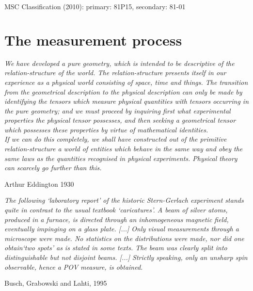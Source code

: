 \documentclass[12pt]{article}
\begin{document}
\bigskip\noindent
MSC Classification (2010): primary: 81P15, secondary: 81-01

\newpage
\tableofcontents %

\newpage
\section{The measurement process}\label{s.measP}

\nopagebreak
\hfill\parbox[t]{10.8cm}{\footnotesize

{\em We have developed a pure geometry, which is intended to be
descriptive of the relation-structure of the world. The
relation-structure presents itself in our experience as a physical world
consisting of space, time and things. The transition from the
geometrical description to the physical description can only be made by
identifying the tensors which measure physical quantities with tensors
occurring in the pure geometry; and we must proceed by inquiring first
what experimental properties the physical tensor possesses, and then
seeking a geometrical tensor which possesses these properties by virtue
of mathematical identities. \\
If we can do this completely, we shall have constructed out of the
primitive relation-structure a world of entities which behave in the
same way and obey the same laws as the quantities recognised in physical
experiments. Physical theory can scarcely go further than this.}

\hfill Arthur Eddington 1930 \cite[p.222]{Edd}
}

\bigskip


\nopagebreak
\hfill\parbox[t]{10.8cm}{\footnotesize

{\em The following `laboratory report' of the historic Stern-Gerlach
experiment stands quite in contrast to the usual textbook `caricatures'.
A beam of silver atoms, produced in a furnace, is directed through an
inhomogeneous magnetic field, eventually impinging on a glass plate.
[...]
Only visual measurements through a microscope were made. No statistics
on the distributions were made, nor did one obtain`two spots' as is
stated in some texts. The beam was clearly split into distinguishable
but not disjoint beams. [...]
Strictly speaking, only an unsharp spin observable, hence a POV measure,
is obtained.}

\hfill Busch, Grabowski and Lahti, 1995 \cite[Example 1, p.7]{BusGL}
}
\end{document}
